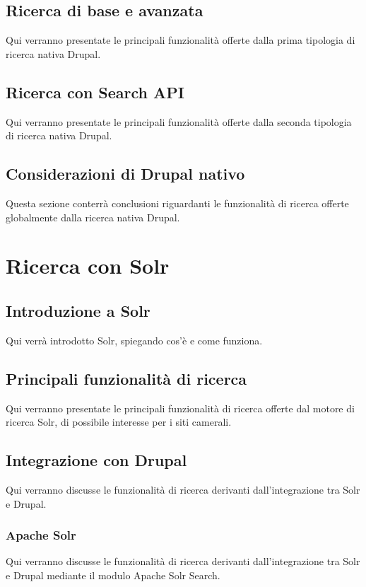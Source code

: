 		\subsection{Ricerca di base e avanzata}
		Qui verranno presentate le principali funzionalità offerte dalla prima tipologia di ricerca nativa Drupal.
		
		\subsection{Ricerca con Search API}
		Qui verranno presentate le principali funzionalità offerte dalla seconda tipologia di ricerca nativa Drupal.
		
		\subsection{Considerazioni di Drupal nativo}
		Questa sezione conterrà conclusioni riguardanti le funzionalità di ricerca offerte globalmente dalla ricerca nativa Drupal.

	\section{Ricerca con Solr}

		\subsection{Introduzione a Solr}
		Qui verrà introdotto Solr, spiegando cos'è e come funziona.
		
		\subsection{Principali funzionalità di ricerca}
		Qui verranno presentate le principali funzionalità di ricerca offerte dal motore di ricerca Solr, di possibile interesse per i siti camerali.
			
		\subsection{Integrazione con Drupal}
		Qui verranno discusse le funzionalità di ricerca derivanti dall'integrazione tra Solr e Drupal.
			
			\subsubsection{Apache Solr}
			Qui verranno discusse le funzionalità di ricerca derivanti dall'integrazione tra Solr e Drupal mediante il modulo Apache Solr Search.
			
